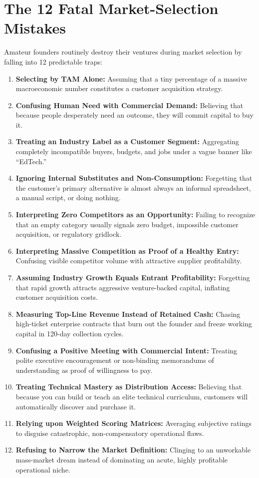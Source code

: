 \section{The 12 Fatal Market-Selection Mistakes}

Amateur founders routinely destroy their ventures during market selection by falling into 12 predictable traps:

\begin{enumerate}[leftmargin=14pt,itemsep=3pt,topsep=2pt]
  \item \textbf{Selecting by TAM Alone:} Assuming that a tiny percentage of a massive macroeconomic number constitutes a customer acquisition strategy.
  \item \textbf{Confusing Human Need with Commercial Demand:} Believing that because people desperately need an outcome, they will commit capital to buy it.
  \item \textbf{Treating an Industry Label as a Customer Segment:} Aggregating completely incompatible buyers, budgets, and jobs under a vague banner like ``EdTech.''
  \item \textbf{Ignoring Internal Substitutes and Non-Consumption:} Forgetting that the customer's primary alternative is almost always an informal spreadsheet, a manual script, or doing nothing.
  \item \textbf{Interpreting Zero Competitors as an Opportunity:} Failing to recognize that an empty category usually signals zero budget, impossible customer acquisition, or regulatory gridlock.
  \item \textbf{Interpreting Massive Competition as Proof of a Healthy Entry:} Confusing visible competitor volume with attractive supplier profitability.
  \item \textbf{Assuming Industry Growth Equals Entrant Profitability:} Forgetting that rapid growth attracts aggressive venture-backed capital, inflating customer acquisition costs.
  \item \textbf{Measuring Top-Line Revenue Instead of Retained Cash:} Chasing high-ticket enterprise contracts that burn out the founder and freeze working capital in 120-day collection cycles.
  \item \textbf{Confusing a Positive Meeting with Commercial Intent:} Treating polite executive encouragement or non-binding memorandums of understanding as proof of willingness to pay.
  \item \textbf{Treating Technical Mastery as Distribution Access:} Believing that because you can build or teach an elite technical curriculum, customers will automatically discover and purchase it.
  \item \textbf{Relying upon Weighted Scoring Matrices:} Averaging subjective ratings to disguise catastrophic, non-compensatory operational flaws.
  \item \textbf{Refusing to Narrow the Market Definition:} Clinging to an unworkable mass-market dream instead of dominating an acute, highly profitable operational niche.
\end{enumerate}

